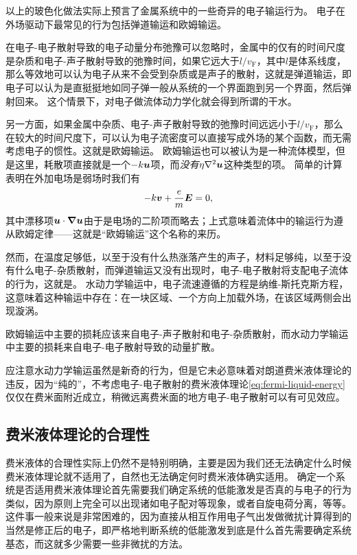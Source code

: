 以上的玻色化做法实际上预言了金属系统中的一些奇异的电子输运行为。
电子在外场驱动下最常见的行为包括弹道输运和欧姆输运。

在电子-电子散射导致的电子动量分布弛豫可以忽略时，金属中的仅有的时间尺度是杂质和电子-声子散射导致的弛豫时间，如果它远大于$l / v_\text{F}$，其中$l$是体系线度，那么等效地可以认为电子从来不会受到杂质或是声子的散射，这就是弹道输运，即电子可以认为是直挺挺地如同子弹一般从系统的一个界面跑到另一个界面，然后弹射回来。
这个情景下，对电子做流体动力学化就会得到所谓的干水。

另一方面，如果金属中杂质、电子-声子散射导致的弛豫时间远远小于$l / v_\text{F}$，那么在较大的时间尺度下，可以认为电子流密度可以直接写成外场的某个函数，而无需考虑电子的惯性。这就是欧姆输运。
欧姆输运也可以被认为是一种流体模型，但是这里，耗散项直接就是一个$- k \vb*{u}$项，而\emph{没有}$\eta \laplacian \vb*{u}$这种类型的项。
简单的计算表明在外加电场是弱场时我们有
\begin{equation}
    - k \vb*{v} + \frac{e}{m} \vb*{E} = 0,
\end{equation}
其中漂移项$\vb*{u} \cdot \grad \vb*{u}$由于是电场的二阶项而略去；上式意味着流体中的输运行为遵从欧姆定律——这就是“欧姆输运”这个名称的来历。

然而，在温度足够低，以至于没有什么热涨落产生的声子，材料足够纯，以至于没有什么电子-杂质散射，而弹道输运又没有出现时，电子-电子散射将支配电子流体的行为，这就是。
水动力学输运中，电子流速遵循的方程是纳维-斯托克斯方程，这意味着这种输运中存在：在一块区域、一个方向上加载外场，在该区域两侧会出现漩涡。

欧姆输运中主要的损耗应该来自电子-声子散射和电子-杂质散射，而水动力学输运中主要的损耗来自电子-电子散射导致的动量扩散。

应注意水动力学输运虽然是新奇的行为，但是它未必意味着对朗道费米液体理论的违反，因为“纯的”，不考虑电子-电子散射的费米液体理论\eqref{eq:fermi-liquid-energy}仅仅在费米面附近成立，稍微远离费米面的地方电子-电子散射可以有可见效应。

\subsection{费米液体理论的合理性}\label{sec:why-fermi-liquid-works}

费米液体的合理性实际上仍然不是特别明确，主要是因为我们还无法确定什么时候费米液体理论就不适用了，自然也无法确定何时费米液体确实适用。
确定一个系统是否适用费米液体理论首先需要我们确定系统的低能激发是否真的与电子的行为类似，因为原则上完全可以出现诸如电子配对等现象，或者自旋电荷分离，等等。
这件事一般来说是非常困难的，因为直接从相互作用电子气出发做微扰计算得到的当然是修正后的电子，即严格地判断系统的低能激发到底是什么首先需要确定系统基态，而这就多少需要一些非微扰的方法。

